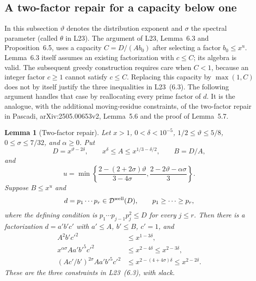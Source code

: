 \documentclass[11pt]{article}
\newtheorem{lemma}[theorem]{Lemma}
\begin{document}
\subsection{A two-factor repair for a capacity below one}
\label{sec:two-factor-greedy-repair}

In this subsection $\vartheta$ denotes the distribution exponent and
$\sigma$ the spectral parameter (called $\theta$ in L23).
The argument of L23, Lemma~6.3 and Proposition~6.5, uses a capacity
$C=D/(A b_0)$ after selecting a factor $b_0\le x^u$.
Lemma~6.3 itself assumes an existing factorization with $c\le C$;
its algebra is valid.  The subsequent greedy construction requires
care when $C<1$, because an integer factor $c\ge1$ cannot satisfy
$c\le C$.  Replacing this capacity by $\max(1,C)$ does not by itself
justify the three inequalities in L23~(6.3).  The following argument
handles that case by reallocating every prime factor of $d$.
It is the analogue, with the additional moving-residue constraints,
of the two-factor repair in Pascadi, arXiv:2505.00653v2,
Lemma~5.6 and the proof of Lemma~5.7.

\begin{lemma}[Two-factor repair]\label{lem:two-factor-greedy-repair}
Let $x>1$, $0<\delta<10^{-5}$, $1/2\le\vartheta\le5/8$,
$0\le\sigma\le7/32$, and $\alpha\ge0$.  Put
\[
 D=x^{\vartheta-2\delta},\qquad
 x^\delta\le A\le x^{1/3-\delta/2},\qquad B=D/A,
\]
and
\[
 u=\min\left\{
 \frac{2-(2+2\sigma)\vartheta}{3-4\sigma},
 \frac{2-2\vartheta-\alpha\sigma}{3}\right\}.
\]
Suppose $B\le x^u$ and
\[
 d=p_1\cdots p_r\in\mathcal D^{\rm well}(D),\qquad
 p_1\ge\cdots\ge p_r,
\]
where the defining condition is
$p_1\cdots p_{j-1}p_j^2\le D$ for every $j\le r$.
Then there is a factorization $d=a'b'c'$ with
$a'\le A$, $b'\le B$, $c'=1$, and
\begin{align}
 A^2b'c'^2&\le x^{1-3\delta},\label{eq:two-factor-repair-first}\\
 x^{\alpha\sigma}Aa'b'^5c'^2&\le x^{2-4\delta}
                       \le x^{2-3\delta},\label{eq:two-factor-repair-second}\\
 (Ac'/b')^{2\sigma}Aa'b'^5c'^2
   &\le x^{2-(4+4\sigma)\delta}
                       \le x^{2-2\delta}.
                       \label{eq:two-factor-repair-third}
\end{align}
These are the three constraints in L23~(6.3), with slack.
\end{lemma}
\end{document}
